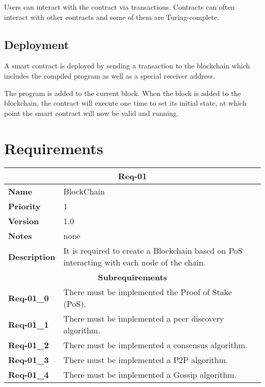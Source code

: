 \documentclass{article}
\begin{document}
Users can interact with the contract via transactions. Contracts can often interact with other contracts
and some of them are Turing-complete.

\subsection{Deployment}

A smart contract is deployed by sending a transaction to the blockchain which includes the compiled program
as well as a special receiver address.

The program is added to the current block. When the block is added to the blockchain, the contract
will execute one time to set its initial state, at which point the smart contract will now be valid and running.


\pagebreak

\section{Requirements}
\bgroup{}
\def\arraystretch{1.25}
\begin{center}
    \begin{tabular}{ |l|p{9cm}| }
        \hline
        \multicolumn{2}{|c|}{\textbf{Req-01}} \\
        \hline
        \textbf{Name} & BlockChain \\
        \hline
        \textbf{Priority} & 1 \\
        \hline
        \textbf{Version} & 1.0 \\
        \hline
        \textbf{Notes} & none \\
        \hline
        \textbf{Description} & It is required to create a Blockchain based on PoS interacting with each node of the chain. \\
        \hline
        \multicolumn{2}{|c|}{\textbf{Subrequirements}} \\
        \hline
        \textbf{Req-01\_0} & There must be implemented the Proof of Stake (PoS). \\
        \hline
        \textbf{Req-01\_1} & There must be implemented a peer discovery algorithm. \\
        \hline
        \textbf{Req-01\_2} & There must be implemented a consensus algorithm. \\
        \hline
        \textbf{Req-01\_3} & There must be implemented a P2P algorithm. \\
        \hline
        \textbf{Req-01\_4} & There must be implemented a Gossip algorithm. \\
        \hline
    \end{tabular}
\end{center}
\egroup{}
\end{document}
